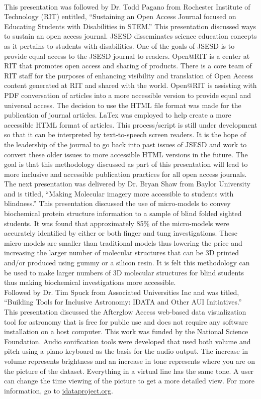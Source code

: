 \documentclass[11pt]{sig-alternate}
\begin{document}
\vspace{2.5 mm}\\This presentation was followed by Dr. Todd Pagano from Rochester Institute of Technology (RIT) entitled, “Sustaining an Open Access Journal focused on Educating Students with Disabilities in STEM.” This presentation discussed ways to sustain an open access journal. JSESD disseminates science education concepts as it pertains to students with disabilities. One of the goals of JSESD is to provide equal access to the JSESD journal to readers. Open@RIT is a center at RIT that promotes open access and sharing of products. There is a core team of RIT staff for the purposes of enhancing visibility and translation of Open Access content generated at RIT and shared with the world. Open@RIT is assisting with PDF conversation of articles into a more accessible version to provide equal and universal access. The decision to use the HTML file format was made for the publication of journal articles. LaTex was employed to help create a more accessible HTML format of articles. This process/script is still under development so that it can be interpreted by text-to-speech screen readers. It is the hope of the leadership of the journal to go back into past issues of JSESD and work to convert these older issues to more accessible HTML versions in the future. The goal is that this methodology discussed as part of this presentation will lead to more inclusive and accessible publication practices for all open access journals.
\vspace{2.5 mm}\\The next presentation was delivered by Dr. Bryan Shaw from Baylor University and is titled, “Making Molecular imagery more accessible to students with blindness.” This presentation discussed the use of micro-models to convey biochemical protein structure information to a sample of blind folded sighted students. It was found that approximately 85\% of the micro-models were accurately identified by either or both finger and tung investigations. These micro-models are smaller than traditional models thus lowering the price and increasing the larger number of molecular structures that can be 3D printed and/or produced using gummy or a silicon resin. It is felt this methodology can be used to make larger numbers of 3D molecular structures for blind students thus making biochemical investigations more accessible.
\vspace{2.5 mm}\\Followed by Dr. Tim Spuck from Associated Universities Inc and was titled, “Building Tools for Inclusive Astronomy: IDATA and Other AUI Initiatives.” This presentation discussed the Afterglow Access web-based data visualization tool for astronomy that is free for public use and does not require any software installation on a host computer. This work was funded by the National Science Foundation. Audio sonification tools were developed that used both volume and pitch using a piano keyboard as the basis for the audio output. The increase in volume represents brightness and an increase in tone represents where you are on the picture of the dataset. Everything in a virtual line has the same tone. A user can change the time viewing of the picture to get a more detailed view. For more information, go to \href{https://www.idataproject.org}{idataproject.org}.
\end{document}
